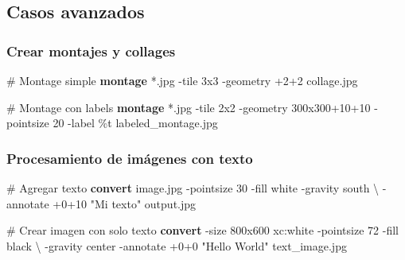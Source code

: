 \documentclass[
  11pt,
  letterpaper,
  oneside,
  openany]{scrbook}
\newenvironment{Shaded}{}{}
\newcommand{\AttributeTok}[1]{\textcolor[rgb]{0.84,0.23,0.29}{#1}}
\newcommand{\BuiltInTok}[1]{\textcolor[rgb]{0.84,0.23,0.29}{#1}}
\newcommand{\CommentTok}[1]{\textcolor[rgb]{0.42,0.45,0.49}{#1}}
\newcommand{\DataTypeTok}[1]{\textcolor[rgb]{0.84,0.23,0.29}{#1}}
\newcommand{\ExtensionTok}[1]{\textcolor[rgb]{0.84,0.23,0.29}{\textbf{#1}}}
\newcommand{\NormalTok}[1]{\textcolor[rgb]{0.14,0.16,0.18}{#1}}
\newcommand{\PreprocessorTok}[1]{\textcolor[rgb]{0.84,0.23,0.29}{#1}}
\newcommand{\StringTok}[1]{\textcolor[rgb]{0.01,0.18,0.38}{#1}}
\newcommand{\VariableTok}[1]{\textcolor[rgb]{0.89,0.38,0.04}{#1}}
\begin{document}
\begin{Shaded}
\end{Shaded}

\subsection{Casos avanzados}\label{casos-avanzados-1}

\subsubsection{Crear montajes y
collages}\label{crear-montajes-y-collages}

\begin{Shaded}
\begin{Highlighting}[]
\CommentTok{\# Montage simple}
\ExtensionTok{montage} \PreprocessorTok{*}\NormalTok{.jpg }\AttributeTok{{-}tile}\NormalTok{ 3x3 }\AttributeTok{{-}geometry}\NormalTok{ +2+2 collage.jpg}

\CommentTok{\# Montage con labels}
\ExtensionTok{montage} \PreprocessorTok{*}\NormalTok{.jpg }\AttributeTok{{-}tile}\NormalTok{ 2x2 }\AttributeTok{{-}geometry}\NormalTok{ 300x300+10+10 }\AttributeTok{{-}pointsize}\NormalTok{ 20 }\AttributeTok{{-}label} \StringTok{\textquotesingle{}\%t\textquotesingle{}}\NormalTok{ labeled\_montage.jpg}
\end{Highlighting}
\end{Shaded}

\subsubsection{Procesamiento de imágenes con
texto}\label{procesamiento-de-imuxe1genes-con-texto}

\begin{Shaded}
\begin{Highlighting}[]
\CommentTok{\# Agregar texto}
\ExtensionTok{convert}\NormalTok{ image.jpg }\AttributeTok{{-}pointsize}\NormalTok{ 30 }\AttributeTok{{-}fill}\NormalTok{ white }\AttributeTok{{-}gravity}\NormalTok{ south }\DataTypeTok{\textbackslash{}}
\NormalTok{{-}annotate +0+10 }\StringTok{"Mi texto"}\NormalTok{ output.jpg}

\CommentTok{\# Crear imagen con solo texto}
\ExtensionTok{convert} \AttributeTok{{-}size}\NormalTok{ 800x600 xc:white }\AttributeTok{{-}pointsize}\NormalTok{ 72 }\AttributeTok{{-}fill}\NormalTok{ black }\DataTypeTok{\textbackslash{}}
\NormalTok{{-}gravity center }\AttributeTok{{-}annotate}\NormalTok{ +0+0 }\StringTok{"Hello World"}\NormalTok{ text\_image.jpg}
\end{Highlighting}
\end{Shaded}
\end{document}
